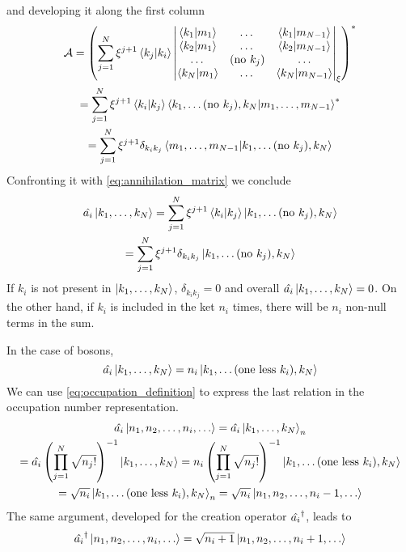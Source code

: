 and developing it along the first column
\begin{multline}
    \mathcal{A} = \left( \sum_{j=1}^N \xi^{j+1} \braket{k_j}{k_i}
    \begin{vmatrix}
        \braket{k_1}{m_1} & \dots            & \braket{k_1}{m_{N-1} } \\
        \braket{k_2}{m_1} & \dots            & \braket{k_2}{m_{N-1}}  \\
        \dots             & (\text{no } k_j) & \dots                  \\
        \braket{k_N}{m_1} & \dots            & \braket{k_N}{m_{N-1}}  \\
    \end{vmatrix}_\xi
    \right)^*
    \\ = \sum_{j=1}^N \xi^{j+1} \braket{k_i}{k_j}  \bra{k_1, \dots (\text{no } k_j), k_N} \ket{m_1, \dots, m_{N-1}}^*
    \\ = \sum_{j=1}^N \xi^{j+1} \delta_{k_ik_j}  \bra{m_1, \dots, m_{N-1}} \ket{k_1, \dots (\text{no } k_j), k_N}
\end{multline}
Confronting it with \cref{eq:annihilation_matrix} we conclude
\begin{multline} \label{eq:annihilation_operator}
    \hat{a_i} \ket{k_1, \dots, k_N}
    = \sum_{j=1}^N \xi^{j+1} \braket{k_i}{k_j} \ket{k_1, \dots (\text{no } k_j), k_N}
    \\= \sum_{j=1}^N \xi^{j+1} \delta_{k_ik_j} \ket{k_1, \dots (\text{no } k_j), k_N}
\end{multline}
If $k_i$ is not present in $\ket{k_1, \dots, k_N}$, $\delta_{k_ik_j} = 0$ and overall $ \hat{a_i} \ket{k_1, \dots, k_N} = 0$. On the other hand, if $k_i$ is included in the ket $n_i$ times, there will be $n_i$ non-null terms in the sum.

In the case of bosons,
\begin{equation}
    \hat{a_i} \ket{k_1, \dots, k_N} = n_i \ket{k_1, \dots (\text{one less }k_i), k_N}
\end{equation}
We can use \cref{eq:occupation_definition} to express the last relation in the occupation number representation.
\begin{multline}
    \hat{a_i} \ket{n_1, n_2, \dots, n_i, \dots} =
    \hat{a_i} \ket{k_1, \dots, k_N}_n
    \\ = \hat{a_i} \left( \prod_{j=1}^N \sqrt{n_j!} \right)^{-1} \ket{k_1, \dots, k_N}
    = n_i \left( \prod_{j=1}^N \sqrt{n_j!} \right)^{-1} \ket{k_1, \dots (\text{one less }k_i), k_N}
    \\ = \sqrt{n_i} \ket{k_1, \dots (\text{one less }k_i), k_N}_n = \sqrt{n_i} \ket{n_1, n_2, \dots, n_i-1, \dots}
\end{multline}
The same argument, developed for the creation operator $\hat{a_i}^\dagger$, leads to
\begin{equation}
    \hat{a_i}^\dagger \ket{n_1, n_2, \dots, n_i, \dots} = \sqrt{n_i+1} \ket{n_1, n_2, \dots, n_i+1, \dots}
\end{equation}

